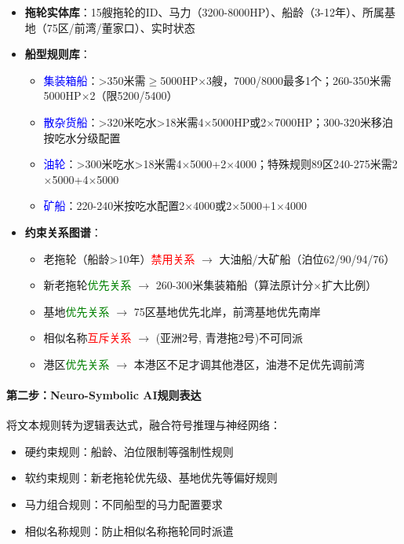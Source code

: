 \documentclass[12pt,a4paper]{article}
\begin{document}
\begin{itemize}[leftmargin=*]
    \item \textbf{拖轮实体库}：15艘拖轮的ID、马力（3200-8000HP）、船龄（3-12年）、所属基地（75区/前湾/董家口）、实时状态
    
    \item \textbf{船型规则库}：
    \begin{itemize}
        \item \textcolor{blue}{集装箱船}：>350米需$\geq$5000HP$\times$3艘，7000/8000最多1个；260-350米需5000HP$\times$2（限5200/5400）
        \item \textcolor{blue}{散杂货船}：>320米吃水>18米需4$\times$5000HP或2$\times$7000HP；300-320米移泊按吃水分级配置
        \item \textcolor{blue}{油轮}：>300米吃水>18米需4$\times$5000+2$\times$4000；特殊规则89区240-275米需2$\times$5000+4$\times$5000
        \item \textcolor{blue}{矿船}：220-240米按吃水配置2$\times$4000或2$\times$5000+1$\times$4000
    \end{itemize}
    
    \item \textbf{约束关系图谱}：
    \begin{itemize}
        \item 老拖轮（船龄>10年）\textcolor{red}{禁用关系} $\rightarrow$ 大油船/大矿船（泊位62/90/94/76）
        \item 新老拖轮\textcolor{green}{优先关系} $\rightarrow$ 260-300米集装箱船（算法原计分$\times$扩大比例）
        \item 基地\textcolor{green}{优先关系} $\rightarrow$ 75区基地优先北岸，前湾基地优先南岸
        \item 相似名称\textcolor{red}{互斥关系} $\rightarrow$ (亚洲2号, 青港拖2号)不可同派
        \item 港区\textcolor{green}{优先关系} $\rightarrow$ 本港区不足才调其他港区，油港不足优先调前湾
    \end{itemize}
\end{itemize}

\paragraph{第二步：Neuro-Symbolic AI规则表达}

将文本规则转为逻辑表达式，融合符号推理与神经网络：
\begin{itemize}[leftmargin=*]
    \item 硬约束规则：船龄、泊位限制等强制性规则
    \item 软约束规则：新老拖轮优先级、基地优先等偏好规则
    \item 马力组合规则：不同船型的马力配置要求
    \item 相似名称规则：防止相似名称拖轮同时派遣
\end{itemize}
\end{document}
